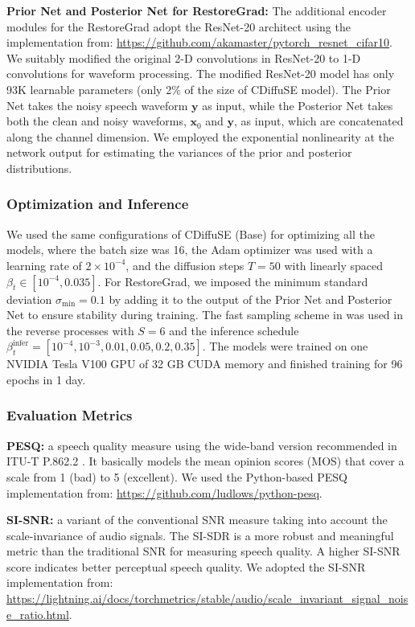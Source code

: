 \noindent\textbf{Prior Net and Posterior Net for RestoreGrad:} The additional encoder modules for the RestoreGrad adopt the ResNet-20 architect \citep{he2016deep} using the implementation from: \url{https://github.com/akamaster/pytorch_resnet_cifar10}. We suitably modified the original 2-D convolutions in ResNet-20 to 1-D convolutions for waveform processing. The modified ResNet-20 model has only 93K learnable parameters (only 2\% of the size of CDiffuSE model). The Prior Net takes the noisy speech waveform $\mathbf{y}$ as input, while the Posterior Net takes both the clean and noisy waveforms, $\mathbf{x}_0$ and $\mathbf{y}$, as input, which are concatenated along the channel dimension. We employed the exponential nonlinearity at the network output for estimating the variances of the prior and posterior distributions.

\subsubsection{Optimization and Inference}
We used the same configurations of CDiffuSE (Base) \citep{lu2022conditional} for optimizing all the models, where the batch size was 16, the Adam optimizer was used with a learning rate of $2\times 10^{-4}$, and the diffusion steps $T=50$ with linearly spaced $\beta_t\in[10^{-4}, 0.035]$. For RestoreGrad, we imposed the minimum standard deviation $\sigma_{\text{min}}=0.1$ by adding it to the output of the Prior Net and Posterior Net to ensure stability during training. The fast sampling scheme in \citet{kong2020diffwave} was used in the reverse processes with $S=6$ and the inference schedule $\beta^{\text{infer}}_t=[10^{-4}, 10^{-3}, 0.01, 0.05, 0.2, 0.35]$. The models were trained on one NVIDIA Tesla V100 GPU of 32 GB CUDA memory and finished training for 96 epochs in 1 day.

\subsubsection{Evaluation Metrics}
\noindent\textbf{PESQ:} a speech quality measure using the wide-band version recommended in ITU-T P.862.2 \citep{itu862}. It basically models the mean opinion scores (MOS) that cover a scale from 1 (bad) to 5 (excellent). We used the Python-based PESQ implementation from: \url{https://github.com/ludlows/python-pesq}.

\noindent\textbf{SI-SNR:} a variant of the conventional SNR measure taking into account the scale-invariance of audio signals. The SI-SDR is a more robust and meaningful metric than the traditional SNR for measuring speech quality. A higher SI-SNR score indicates better perceptual speech quality. We adopted the SI-SNR implementation from: \url{https://lightning.ai/docs/torchmetrics/stable/audio/scale_invariant_signal_noise_ratio.html}.


